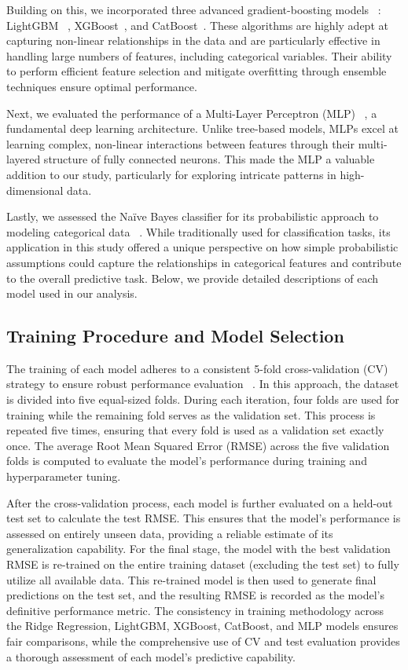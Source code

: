 \documentclass{article}
\begin{document}
Building on this, we incorporated three advanced gradient-boosting models ~\cite{4a848dd1-54e3-3c3c-83c3-04977ded2e71}: LightGBM ~\cite{NIPS2017_6449f44a}, XGBoost~\cite{10.1145/2939672.2939785}, and CatBoost~\cite{10.5555/3327757.3327770}. These algorithms are highly adept at capturing non-linear relationships in the data and are particularly effective in handling large numbers of features, including categorical variables. Their ability to perform efficient feature selection and mitigate overfitting through ensemble techniques ensure optimal performance.

Next, we evaluated the performance of a Multi-Layer Perceptron (MLP) ~\cite{10.5555/1639537.1639542}, a fundamental deep learning architecture. Unlike tree-based models, MLPs excel at learning complex, non-linear interactions between features through their multi-layered structure of fully connected neurons. This made the MLP a valuable addition to our study, particularly for exploring intricate patterns in high-dimensional data.

Lastly, we assessed the Na\"{i}ve Bayes classifier for its probabilistic approach to modeling categorical data ~\cite{8947658}. While traditionally used for classification tasks, its application in this study offered a unique perspective on how simple probabilistic assumptions could capture the relationships in categorical features and contribute to the overall predictive task. Below, we provide detailed descriptions of each model used in our analysis.

\subsection{Training Procedure and Model Selection}

The training of each model adheres to a consistent 5-fold cross-validation (CV) strategy to ensure robust performance evaluation ~\cite{wong2019reliable}. In this approach, the dataset is divided into five equal-sized folds. During each iteration, four folds are used for training while the remaining fold serves as the validation set. This process is repeated five times, ensuring that every fold is used as a validation set exactly once. The average Root Mean Squared Error (RMSE) across the five validation folds is computed to evaluate the model's performance during training and hyperparameter tuning.

After the cross-validation process, each model is further evaluated on a held-out test set to calculate the test RMSE. This ensures that the model's performance is assessed on entirely unseen data, providing a reliable estimate of its generalization capability. For the final stage, the model with the best validation RMSE is re-trained on the entire training dataset (excluding the test set) to fully utilize all available data. This re-trained model is then used to generate final predictions on the test set, and the resulting RMSE is recorded as the model's definitive performance metric. The consistency in training methodology across the Ridge Regression, LightGBM, XGBoost, CatBoost, and MLP models ensures fair comparisons, while the comprehensive use of CV and test evaluation provides a thorough assessment of each model's predictive capability.
\end{document}
